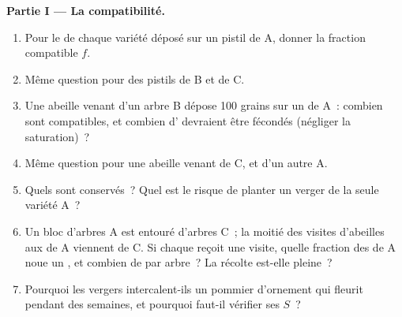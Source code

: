 \begin{problem}
\medskip
\noindent\textbf{Partie I --- La compatibilité.}
\begin{enumerate}
  \item Pour le  de chaque variété déposé sur un pistil de A,
        donner la fraction compatible $f$.
  \item Même question pour des pistils de B et de C.
  \item Une abeille venant d'un arbre B dépose 100 grains sur un
         de A~: combien sont compatibles, et combien d'
        devraient être fécondés (négliger la saturation)~?
  \item Même question pour une abeille venant de C, et d'un autre A.
  \item Quels  sont conservés~? Quel est le risque de planter un
        verger de la seule variété A~?
  \item Un bloc d'arbres A est entouré d'arbres C~; la moitié des
        visites d'abeilles aux  de A viennent de C. Si chaque
         reçoit une visite, quelle fraction des  de A noue un
        , et combien de  par arbre~? La récolte est-elle
        pleine~?
  \item Pourquoi les vergers intercalent-ils un pommier d'ornement qui
        fleurit pendant des semaines, et pourquoi faut-il vérifier ses
         $S$~?
\end{enumerate}


\end{problem}
